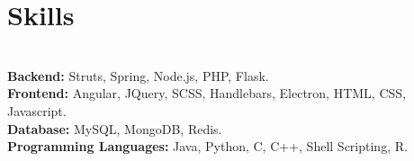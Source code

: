 \documentclass{resume}
\begin{document}
\section*{Skills}
\titlerule
\noindent
\\
\textbf{Backend:} Struts, Spring, Node.js, PHP, Flask. \\
\textbf{Frontend:} Angular, JQuery, SCSS, Handlebars, Electron, HTML, CSS, Javascript. \\
\textbf{Database:} MySQL, MongoDB, Redis. \\
\textbf{Programming Languages:} Java, Python, C, C++, Shell Scripting, R.\\
\end{document}
